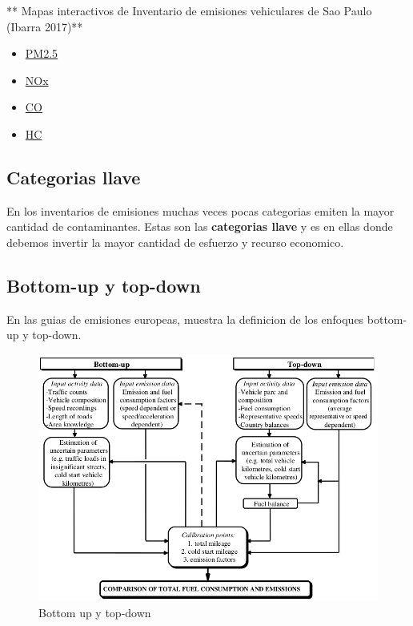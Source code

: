 \documentclass[]{book}
\providecommand{\tightlist}{%
  \setlength{\itemsep}{0pt}\setlength{\parskip}{0pt}}
\begin{document}
** Mapas interactivos de Inventario de emisiones vehiculares de Sao Paulo (Ibarra 2017)**

\begin{itemize}
\tightlist
\item
  \href{http://jornal.usp.br/wp-content/uploads/gPM.html}{PM2.5}
\item
  \href{http://jornal.usp.br/wp-content/uploads/gNOx.html}{NOx}
\item
  \href{http://jornal.usp.br/wp-content/uploads/gCO.html}{CO}
\item
  \href{http://jornal.usp.br/wp-content/uploads/gHC.html}{HC}
\end{itemize}

\hypertarget{categorias-llave}{%
\subsection{Categorias llave}\label{categorias-llave}}

En los inventarios de emisiones muchas veces pocas categorias emiten la mayor cantidad de contaminantes. Estas son las \textbf{categorias llave} y es en ellas donde debemos invertir la mayor cantidad de esfuerzo y recurso economico.

\hypertarget{bottom-up-y-top-down}{%
\subsection{Bottom-up y top-down}\label{bottom-up-y-top-down}}

En las guias de emisiones europeas, \citeyearpar{NtziachristosSamaras2016} muestra la definicion de los enfoques bottom-up y top-down.

\begin{figure}
\includegraphics[width=1.2\linewidth]{figs/bt} \caption{Bottom up y top-down}\label{fig:unnamed-chunk-26}
\end{figure}
\end{document}
